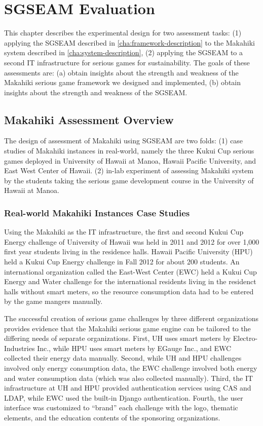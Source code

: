 \chapter{SGSEAM Evaluation}
\label{cha:ExperimentalDesign}

This chapter describes the experimental design for two assessment tasks: (1) applying the SGSEAM described in \autoref{cha:framework-description} to the Makahiki system described in \autoref{cha:system-description}, (2) applying the SGSEAM to a second IT infrastructure for serious games for sustainability. The goals of these assessments are: (a) obtain insights about
 the strength and weakness of the Makahiki serious game framework we designed and implemented,
 (b) obtain insights about the strength and weakness of the SGSEAM.

\section{Makahiki Assessment Overview}
The design of assessment of Makahiki using SGSEAM are two folds: (1) case studies of Makahiki instances in real-world, namely the three Kukui Cup serious games deployed in University of Hawaii at Manoa, Hawaii Pacific University, and East West Center of Hawaii. (2) in-lab experiment of assessing Makahiki system by the students taking the serious game development course in the University of Hawaii at Manoa.

\subsection{Real-world Makahiki Instances Case Studies}

Using the Makahiki as the IT infrastructure, the first and second Kukui Cup Energy challenge of University of Hawaii was held in 2011 and 2012 for over 1,000 first year students living in the residence halls. Hawaii Pacific University (HPU) held a Kukui Cup Energy challenge in Fall 2012 for about 200 students. An international organization called the East-West Center (EWC) held a Kukui Cup Energy and Water challenge for the international residents living in the residenct halls without smart meters, so the resource consumption data had to be entered by the game mangers manually.

The successful creation of serious game challenges by three different organizations provides evidence that the Makahiki serious game engine can be tailored to the differing needs of separate organizations. First, UH uses smart meters by Electro-Industries Inc., while HPU uses smart meters by EGauge Inc., and EWC collected their energy data manually. Second, while UH and HPU challenges involved only energy consumption data, the EWC challenge involved both energy and water consumption data (which was also collected manually).  Third, the IT infrastructure at UH and HPU provided authentication services using CAS and LDAP, while EWC used the built-in Django authentication. Fourth, the user interface was customized to ``brand'' each challenge with the logo, thematic elements, and the education contents of the sponsoring organizations.

